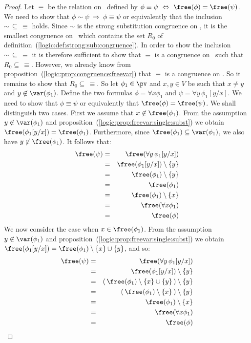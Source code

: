 \begin{proof}
Let $\equiv$ be the relation on \pv\ defined by $\phi\equiv\psi\
\Leftrightarrow\ \free(\phi)=\free(\psi)$. We need to show that
$\phi\sim\psi\ \Rightarrow\ \phi\equiv\psi$ or equivalently that the
inclusion $\sim\,\subseteq\,\equiv$ holds. Since $\sim$ is the
strong substitution congruence on \pv, it is the smallest congruence
on \pv\ which contains the set $R_{0}$ of
definition~(\ref{logic:def:strong:sub:congruence}). In order to show
the inclusion $\sim\,\subseteq\,\equiv$ it is therefore sufficient
to show that $\equiv$ is a congruence on \pv\ such that
$R_{0}\subseteq\,\equiv$. However, we already know from
proposition~(\ref{logic:prop:congruence:freevar}) that $\equiv$ is a
congruence on \pv. So it remains to show that
$R_{0}\subseteq\,\equiv$. So let $\phi_{1}\in\pv$ and $x,y\in V$ be
such that $x\neq y$ and $y\not\in\var(\phi_{1})$. Define the two
formulas $\phi=\forall x\phi_{1}$ and $\psi=\forall
y\,\phi_{1}[y/x]$. We need to show that $\phi\equiv\psi$ or
equivalently that $\free(\phi)=\free(\psi)$. We shall distinguish
two cases. First we assume that $x\not\in\free(\phi_{1})$. From the
assumption $y\not\in\var(\phi_{1})$ and
proposition~(\ref{logic:prop:freevar:single:subst}) we obtain
$\free(\phi_{1}[y/x])=\free(\phi_{1})$. Furthermore, since
$\free(\phi_{1})\subseteq\var(\phi_{1})$, we also have
$y\not\in\free(\phi_{1})$. It follows that:
    \begin{eqnarray*}
    \free(\psi)&=&\free(\forall y\,\phi_{1}[y/x])\\
    &=&\free(\phi_{1}[y/x])\setminus\{y\}\\
    &=&\free(\phi_{1})\setminus\{y\}\\
    &=&\free(\phi_{1})\\
    &=&\free(\phi_{1})\setminus\{x\}\\
    &=&\free(\forall x\phi_{1})\\
    &=&\free(\phi)
    \end{eqnarray*}
We now consider the case when $x\in\free(\phi_{1})$. From the
assumption $y\not\in\var(\phi_{1})$ and
proposition~(\ref{logic:prop:freevar:single:subst}) we obtain
$\free(\phi_{1}[y/x])=\free(\phi_{1})\setminus\{x\}\cup\{y\}$, and
so:
\begin{eqnarray*}
    \free(\psi)&=&\free(\forall y\,\phi_{1}[y/x])\\
    &=&\free(\phi_{1}[y/x])\setminus\{y\}\\
    &=&(\,\free(\phi_{1})\setminus\{x\}\cup\{y\}\,)\setminus\{y\}\\
    &=&(\,\free(\phi_{1})\setminus\{x\}\,)\setminus\{y\}\\
    &=&\free(\phi_{1})\setminus\{x\}\\
    &=&\free(\forall x\phi_{1})\\
    &=&\free(\phi)
    \end{eqnarray*}
\end{proof}
